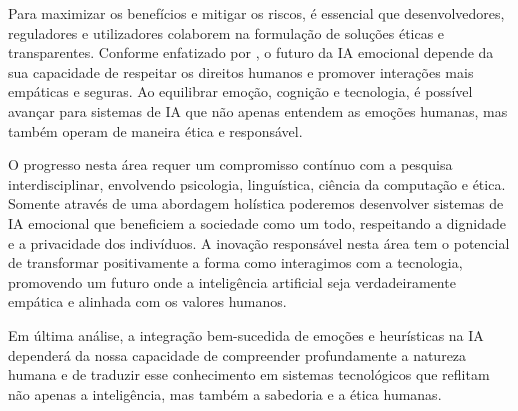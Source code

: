 \documentclass[a4paper,12pt]{report}
\begin{document}
	Para maximizar os benefícios e mitigar os riscos, é essencial que desenvolvedores, reguladores e utilizadores colaborem na formulação de soluções éticas e transparentes. Conforme enfatizado por \textcite{russell2020}, o futuro da IA emocional depende da sua capacidade de respeitar os direitos humanos e promover interações mais empáticas e seguras. Ao equilibrar emoção, cognição e tecnologia, é possível avançar para sistemas de IA que não apenas entendem as emoções humanas, mas também operam de maneira ética e responsável.
	
	O progresso nesta área requer um compromisso contínuo com a pesquisa interdisciplinar, envolvendo psicologia, linguística, ciência da computação e ética. Somente através de uma abordagem holística poderemos desenvolver sistemas de IA emocional que beneficiem a sociedade como um todo, respeitando a dignidade e a privacidade dos indivíduos. A inovação responsável nesta área tem o potencial de transformar positivamente a forma como interagimos com a tecnologia, promovendo um futuro onde a inteligência artificial seja verdadeiramente empática e alinhada com os valores humanos.
	
	Em última análise, a integração bem-sucedida de emoções e heurísticas na IA dependerá da nossa capacidade de compreender profundamente a natureza humana e de traduzir esse conhecimento em sistemas tecnológicos que reflitam não apenas a inteligência, mas também a sabedoria e a ética humanas.
	
	\newpage
	
	\printbibliography
	
\end{document}
